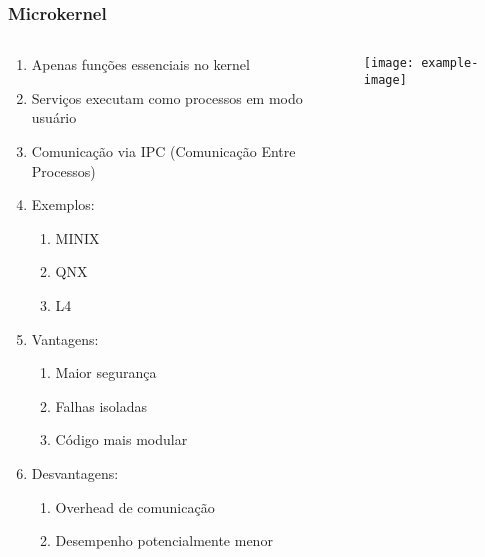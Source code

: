 \documentclass{beamer}
\begin{document}
\begin{frame}[fragile]
\frametitle{Microkernel}

\begin{columns}
    \begin{column}{0.5\textwidth}
        \begin{enumerate}
            \item Apenas funções essenciais no kernel
            \item Serviços executam como processos em modo usuário
            \item Comunicação via IPC (Comunicação Entre Processos)
            \item Exemplos:
            \begin{enumerate}
                \item MINIX
                \item QNX
                \item L4
            \end{enumerate}
            \item Vantagens:
            \begin{enumerate}
                \item Maior segurança
                \item Falhas isoladas
                \item Código mais modular
            \end{enumerate}
            \item Desvantagens:
            \begin{enumerate}
                \item Overhead de comunicação
                \item Desempenho potencialmente menor
            \end{enumerate}
        \end{enumerate}
    \end{column}
    
    \begin{column}{0.5\textwidth}
        \begin{center}
            \texttt{[image: example-image]}
        \end{center}
    \end{column}
\end{columns}
\end{frame}
\end{document}
